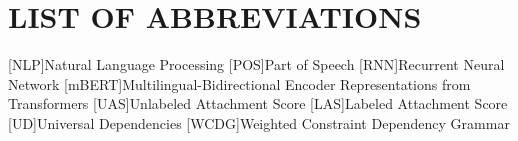  \noindent


\chapter*{LIST OF ABBREVIATIONS}
\begin{acronym}
        [NLP]{Natural Language Processing}
        [POS]{Part of Speech}
        [RNN]{Recurrent Neural Network}
        [mBERT]{Multilingual-Bidirectional Encoder Representations from Transformers}
        [UAS]{Unlabeled Attachment Score}
        [LAS]{Labeled Attachment Score}
        [UD]{Universal Dependencies}
        [WCDG]{Weighted Constraint Dependency Grammar}
\end{acronym}
